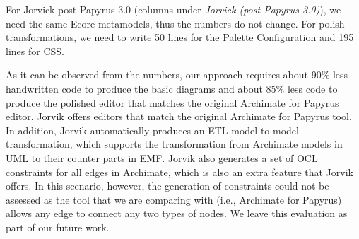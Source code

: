 For Jorvick post-Papyrus 3.0 (columns under \textit{Jorvick (post-Papyrus 3.0)}), we need the same Ecore metamodels, thus the numbers do not change. 
For polish transformations, we need to write 50 lines for the Palette Configuration and 195 lines for CSS. 

As it can be observed from the numbers, our approach requires about 90\% less handwritten code to produce the basic diagrams and about 85\% less code to 
produce the polished editor that matches the original Archimate for Papyrus editor. 
Jorvik offers editors that match the original Archimate for Papyrus tool.
In addition, Jorvik automatically produces an ETL model-to-model transformation, which supports the transformation from Archimate models in UML to their counter parts in EMF.
Jorvik also generates a set of OCL constraints for all edges in Archimate, which is also an extra feature that Jorvik offers.
In this scenario, however, the generation of constraints could not be assessed as the tool that we are comparing with (i.e., Archimate for Papyrus) allows any edge to connect any two types of nodes. We leave this evaluation as part of our future work.

